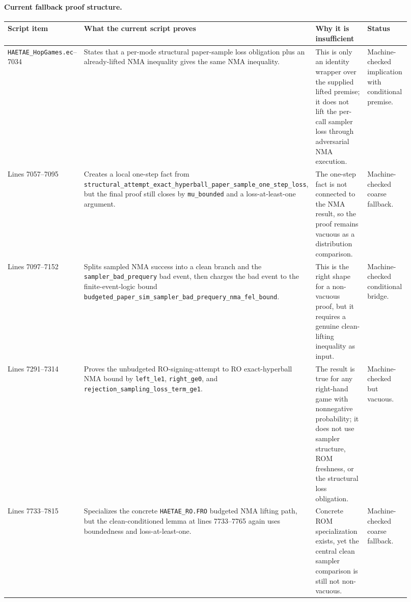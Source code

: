 \documentclass[11pt]{report}
\DeclareRobustCommand{\file}[1]{\ifmmode\text{\nolinkurl{#1}}\else\nolinkurl{#1}\fi}
\DeclareRobustCommand{\ec}[1]{\ifmmode\text{\nolinkurl{#1}}\else\nolinkurl{#1}\fi}
\theoremstyle{definition}
\theoremstyle{plain}
\begin{document}
\paragraph{Current fallback proof structure.}
{\scriptsize
\begin{longtable}{p{0.18\linewidth}p{0.29\linewidth}p{0.28\linewidth}p{0.17\linewidth}}
\toprule
\textbf{Script item} & \textbf{What the current script proves} &
\textbf{Why it is insufficient} & \textbf{Status} \\
\midrule
\file{HAETAE\_HopGames.ec} 7016--7034 &
States that a per-mode structural paper-sample loss obligation plus an
already-lifted NMA inequality gives the same NMA inequality. &
This is only an identity wrapper over the supplied lifted premise; it does not
lift the per-call sampler loss through adversarial NMA execution. &
Machine-checked implication with conditional premise. \\
\midrule
Lines 7057--7095 &
Creates a local one-step fact from
\ec{structural\_attempt\_exact\_hyperball\_paper\_sample\_one\_step\_loss},
but the final proof still closes by \ec{mu\_bounded} and a loss-at-least-one
argument. &
The one-step fact is not connected to the NMA result, so the proof remains
vacuous as a distribution comparison. &
Machine-checked coarse fallback. \\
\midrule
Lines 7097--7152 &
Splits sampled NMA success into a clean branch and the
\ec{sampler\_bad\_prequery} bad event, then charges the bad event to the
finite-event-logic bound
\ec{budgeted\_paper\_sim\_sampler\_bad\_prequery\_nma\_fel\_bound}. &
This is the right shape for a non-vacuous proof, but it requires a genuine
clean-lifting inequality as input. &
Machine-checked conditional bridge. \\
\midrule
Lines 7291--7314 &
Proves the unbudgeted RO-signing-attempt to RO exact-hyperball NMA bound by
\ec{left\_le1}, \ec{right\_ge0}, and
\ec{rejection\_sampling\_loss\_term\_ge1}. &
The result is true for any right-hand game with nonnegative probability; it
does not use sampler structure, ROM freshness, or the structural loss
obligation. &
Machine-checked but vacuous. \\
\midrule
Lines 7733--7815 &
Specializes the concrete \ec{HAETAE\_RO.FRO} budgeted NMA lifting path, but
the clean-conditioned lemma at lines 7733--7765 again uses boundedness and
loss-at-least-one. &
Concrete ROM specialization exists, yet the central clean sampler comparison
is still not non-vacuous. &
Machine-checked coarse fallback. \\
\bottomrule
\end{longtable}
}
\end{document}
